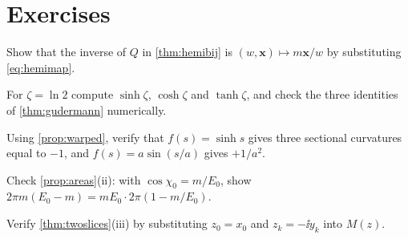 \section*{Exercises}
\begin{exercise}
Show that the inverse of $Q$ in \cref{thm:hemibij} is $(w,\mathbf x)\mapsto m\mathbf x/w$ by substituting \eqref{eq:hemimap}.
\end{exercise}
\begin{exercise}
For $\zeta=\ln 2$ compute $\sinh\zeta$, $\cosh\zeta$ and $\tanh\zeta$, and check the three identities of \cref{thm:gudermann} numerically.
\end{exercise}
\begin{exercise}
Using \cref{prop:warped}, verify that $f(s)=\sinh s$ gives three sectional curvatures equal to $-1$, and $f(s)=a\sin(s/a)$ gives $+1/a^2$.
\end{exercise}
\begin{exercise}
Check \cref{prop:areas}(ii): with $\cos\chi_0=m/E_0$, show $2\pi m(E_0-m)=mE_0\cdot2\pi(1-m/E_0)$.
\end{exercise}
\begin{exercise}
Verify \cref{thm:twoslices}(iii) by substituting $z_0=x_0$ and $z_k=-\ii y_k$ into $M(z)$.
\end{exercise}

